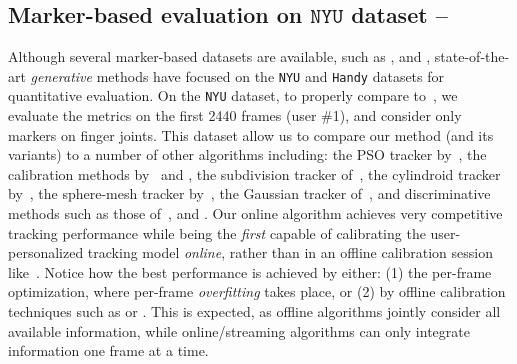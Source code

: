 
\subsection{Marker-based evaluation on $\texttt{NYU}$ dataset --
}
\label{sec:evalnyu}
Although several marker-based datasets are available, such as \cite{qian2014realtime}, \cite{sharp2015accurate} and \cite{yuan2017bighand}, state-of-the-art \emph{generative} methods have focused on the \texttt{NYU} \cite{tompson2014real} and \texttt{Handy} \cite{tkach2016sphere} datasets for quantitative evaluation. 
On the \texttt{NYU} dataset, to properly compare to~, we evaluate the metrics on the first 2440 frames (user \#1), and consider only markers on finger joints.
%
This dataset allow us to compare our method (and its variants) to a number of other algorithms including: the PSO tracker by~, the calibration methods by~ and , the subdivision tracker of~, the cylindroid tracker by~, the sphere-mesh tracker by~, the Gaussian tracker of~, and discriminative methods such as those of~,  and . 
% 
% 
Our online algorithm achieves very competitive tracking performance while being the \emph{first} capable of calibrating the user-personalized tracking model \emph{online}, rather than in an offline calibration session like~. 
% 
Notice how the best performance is achieved by either: (1) the per-frame optimization, where per-frame \emph{overfitting} takes place, or (2) by offline calibration techniques such as \OfflineSoft{} or \cite{taylor2016joint}. This is expected, as offline algorithms jointly consider all available information, while online/streaming algorithms can only integrate information one frame at a time.


